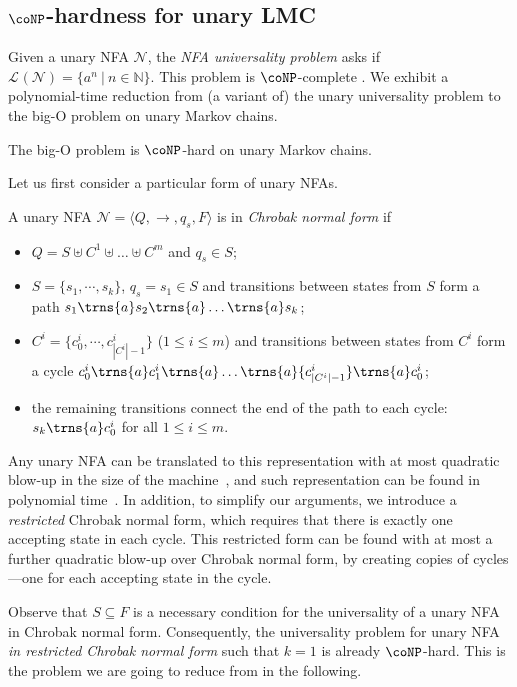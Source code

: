 \documentclass[10pt,a4paper]{amsart}
\numberwithin{equation}{section}
\theoremstyle{plain}
\theoremstyle{definition}
\theoremstyle{remark}
\newcommand\abra[1]{\langle #1 \rangle}
\newcommand\lng[2]{\mathcal{L}_{#1}(#2)}
\newcommand\nfa{\mathcal{N}}
\begin{document}
\subsection{\texorpdfstring{$\coNP$}{coNP}-hardness for unary LMC}
\label{sec:conphardness}

Given a unary NFA $\nfa$, the \textit{NFA universality problem} asks if $\lng{}{\nfa} = \{a^n\ |\ n\in \mathbb{N}\}$. This problem is $\coNP$-complete \cite{stockmeyer1973word}.
We exhibit a polynomial-time reduction from  (a variant of) the unary universality problem  to the big-O problem on unary Markov chains.

\begin{thm}\label{thm:boundedhard}
The big-O problem is $\coNP$-hard on unary Markov chains.
\end{thm}

Let us first consider a particular form of unary NFAs.
\begin{defi}\label{defn:chro}
A unary NFA $\nfa = \abra{Q, \to, q_s,F}$ is in \textit{Chrobak normal form} \cite{chrobak1986finite} if
\begin{itemize}
  \item $Q = S \uplus C^1 \uplus \dots \uplus C^m$ and $q_s\in S$;
  \item $S=\{ s_1,\cdots,s_k \}$, $q_s=s_1\in S$ and transitions between states from $S$ form a path $s_1 \trns{a} s_2 \trns{a}  \dots \trns{a} s_k$;
  \item $C^i=\{c^i_0,\cdots, c^i_{|C^i|-1}\}$ ($1\le i\le m$) and transitions between states from  $C^i$ form  a cycle $c^i_0 \trns{a} c^i_1 \trns{a}  \dots \trns{a} {c^i_{|C^i|-1}} \trns{a} c^i_0$;
  \item the remaining transitions connect the end of the path to each cycle:  $s_k \trns{a} c^i_0$ for all $1\le i\le m$.
\end{itemize}
\end{defi}
Any unary NFA can be translated to this representation with at most quadratic blow-up in the size of the machine~\cite{chrobak1986finite}, and such representation can be found in polynomial time~\cite{to2009unary,martinez2002efficient}.
In addition, to simplify our arguments, we introduce a \textit{restricted} Chrobak normal form, which requires that there is exactly one accepting state in each cycle.
This restricted form can be found with at most a further quadratic blow-up over Chrobak normal form, by creating copies of cycles---one for each accepting state in the cycle.

Observe that $S\subseteq F$ is a necessary condition for the universality of a unary NFA in Chrobak normal form. Consequently, the universality problem for unary NFA  \textit{in restricted
Chrobak normal form} such that $k=1$  is already $\coNP$-hard. This is the problem we are going to reduce from in the following.
\end{document}
